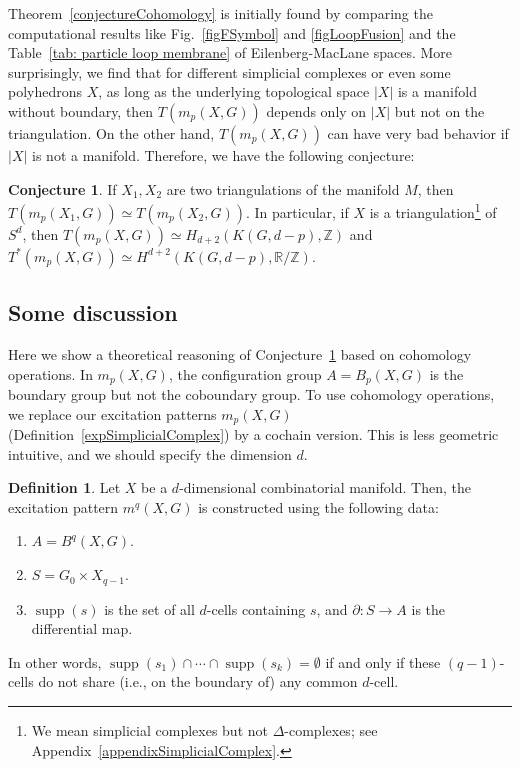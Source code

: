 \documentclass[reprint, amsmath, amssymb, showpacs, floatfix, longbibliography, aps, twocolumn, superscriptaddress, nofootinbib]{revtex4-2}
\newcommand{\ZZ}{{\mathbb Z}}
\newcommand{\RR}{{\mathbb R}}
\newcommand{\supp}{\operatorname{supp}}
\theoremstyle{definition}
\newtheorem{conjecture}{Conjecture}[section]
\newtheorem{definition}{Definition}[section]
\begin{document}
 
Theorem~\ref{conjectureCohomology} is initially found by comparing the computational results like Fig.~\ref{figFSymbol} and \ref{figLoopFusion} and the Table~\ref{tab: particle loop membrane} of Eilenberg-MacLane spaces. More surprisingly, we find that for different simplicial complexes or even some polyhedrons $X$, as long as the underlying topological space $|X|$ is a manifold without boundary, then $T(m_p(X,G))$ depends only on $|X|$ but not on the triangulation. On the other hand, $T(m_p(X,G))$ can have very bad behavior if $|X|$ is not a manifold. Therefore, we have the following conjecture:
 
 \begin{conjecture}\label{conjectureDef}
 	If $X_1,X_2$ are two triangulations of the manifold $M$, then $T(m_p(X_1,G))\simeq T(m_p(X_2,G))$. In particular, if $X$ is a triangulation\footnote{We mean simplicial complexes but not $\Delta$-complexes; see Appendix~\ref{appendixSimplicialComplex}.} of $S^d$, then $T(m_p(X,G))\simeq H_{d+2}(K(G,d-p),\ZZ)$ and $T^*(m_p(X,G))\simeq H^{d+2}(K(G,d-p),\RR/\ZZ)$.
 \end{conjecture}

\subsection{Some discussion}

Here we show a theoretical reasoning of Conjecture~\ref{conjectureDef} based on cohomology operations.
In $m_p(X,G)$, the configuration group $A=B_p(X,G)$ is the boundary group but not the coboundary group. To use cohomology operations, we replace our excitation patterns $m_p(X,G)$ (Definition~\ref{expSimplicialComplex}) by a cochain version. This is less geometric intuitive, and we should specify the dimension $d$.

\begin{definition}\label{expDualCell}
	Let $X$ be a $d$-dimensional combinatorial manifold. Then, the excitation pattern $m^q(X,G)$ is constructed using the following data:
	\begin{enumerate}
		\item \(A = B^q(X, G)\).
		\item \(S = G_0\times X_{q-1}\). 
		\item  \(\operatorname{supp}(s)\) is the set of all $d$-cells containing $s$, and \(\partial: S\rightarrow A\) is the differential map.
	\end{enumerate}
	In other words, $\supp(s_1)\cap\cdots\cap\supp(s_k)=\emptyset$ if and only if these $(q-1)$-cells do not share (i.e., on the boundary of) any common $d$-cell.
\end{definition}
\end{document}
